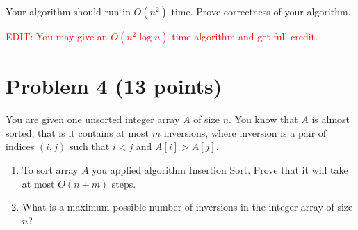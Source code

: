 \documentclass[letterpaper, 11pt]{article}
\begin{document}
Your algorithm should run in $O(n^2)$ time. Prove correctness of your algorithm. 

\textcolor{red}{EDIT: You may give an $O(n^2 \log n)$ time algorithm and get full-credit.}


\section{Problem 4 (13 points)}
You are given one unsorted integer array $A$ of size $n$. You know that $A$ is almost sorted, that is it contains at most $m$ inversions, where inversion is a pair of indices $(i,j)$ such that $i < j$ and $A[i] > A[j]$.  
\begin{enumerate}

\item To sort array $A$ you applied algorithm Insertion Sort. Prove that it will take at most $O(n + m)$ steps. 


\item What is a maximum possible number of inversions in the integer array of size $n$?       

\end{enumerate}
\end{document}
